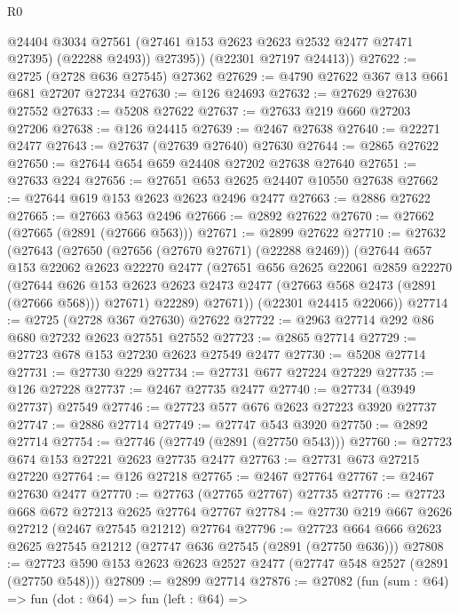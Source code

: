 \begin{lexlean}{R0}
\begin{coremodule}
            @24404
            @3034
            @27561
            (@27461 @153 @2623 @2623 @2532 @2477 @27471 @27395)
            (@22288 @2493))
          @27395))
      (@22301 @27197 @24413))
@27622 := @2725 (@2728 @636 @27545) @27362
@27629 := @4790 @27622 @367 @13 @661 @681 @27207 @27234
@27630 := @126 @24693
@27632 := @27629 @27630 @27552
@27633 := @5208 @27622
@27637 := @27633 @219 @660 @27203 @27206
@27638 := @126 @24415
@27639 := @2467 @27638
@27640 := @22271 @2477
@27643 := @27637 (@27639 @27640) @27630
@27644 := @2865 @27622
@27650 := @27644 @654 @659 @24408 @27202 @27638 @27640
@27651 := @27633 @224
@27656 := @27651 @653 @2625 @24407 @10550 @27638
@27662 := @27644 @619 @153 @2623 @2623 @2496 @2477
@27663 := @2886 @27622
@27665 := @27663 @563 @2496
@27666 := @2892 @27622
@27670 := @27662 (@27665 (@2891 (@27666 @563)))
@27671 := @2899 @27622
@27710 := @27632
    (@27643
      (@27650
        (@27656 (@27670 @27671) (@22288 @2469))
        (@27644
          @657
          @153
          @22062
          @2623
          @22270
          @2477
          (@27651
            @656
            @2625
            @22061
            @2859
            @22270
            (@27644
              @626
              @153
              @2623
              @2623
              @2473
              @2477
              (@27663 @568 @2473 (@2891 (@27666 @568)))
              @27671)
            @22289)
          @27671))
      (@22301 @24415 @22066))
@27714 := @2725 (@2728 @367 @27630) @27622
@27722 := @2963 @27714 @292 @86 @680 @27232 @2623 @27551 @27552
@27723 := @2865 @27714
@27729 := @27723 @678 @153 @27230 @2623 @27549 @2477
@27730 := @5208 @27714
@27731 := @27730 @229
@27734 := @27731 @677 @27224 @27229
@27735 := @126 @27228
@27737 := @2467 @27735 @2477
@27740 := @27734 (@3949 @27737) @27549
@27746 := @27723 @577 @676 @2623 @27223 @3920 @27737
@27747 := @2886 @27714
@27749 := @27747 @543 @3920
@27750 := @2892 @27714
@27754 := @27746 (@27749 (@2891 (@27750 @543)))
@27760 := @27723 @674 @153 @27221 @2623 @27735 @2477
@27763 := @27731 @673 @27215 @27220
@27764 := @126 @27218
@27765 := @2467 @27764
@27767 := @2467 @27630 @2477
@27770 := @27763 (@27765 @27767) @27735
@27776 := @27723 @668 @672 @27213 @2625 @27764 @27767
@27784 := @27730 @219 @667 @2626 @27212 (@2467 @27545 @21212) @27764
@27796 := @27723 @664 @666 @2623 @2625 @27545 @21212 (@27747 @636 @27545 (@2891 (@27750 @636)))
@27808 := @27723 @590 @153 @2623 @2623 @2527 @2477 (@27747 @548 @2527 (@2891 (@27750 @548)))
@27809 := @2899 @27714
@27876 := @27082
    (fun (sum : @64) =>
    fun (dot : @64) =>
    fun (left : @64) =>

\end{coremodule}
\end{lexlean}
